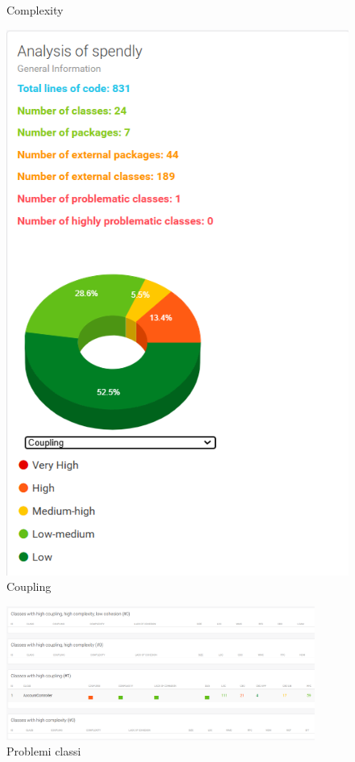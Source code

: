 \begin{figure}[H]
\begin{minipage}{0.45\textwidth}
        \caption{Complexity}
        \label{fig:Complexity_iterazione1}
    \end{minipage}
    \hfill
    \begin{minipage}{0.45\textwidth}
        \centering
        \includegraphics[width=\textwidth]{images/coupling_iter1.png}
        \caption{Coupling}
        \label{fig:Coupling_iterazione1}
    \end{minipage}
\end{figure}

\begin{figure}[H]
    \centering
    \includegraphics[width=0.9\textwidth]{images/Problem_iter1.png}
    \caption{Problemi classi}
    \label{fig:Problemi_iterazione1}
\end{figure}



